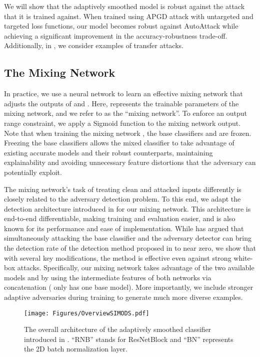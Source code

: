 \documentclass[11pt, letterpaper]{article}
\theoremstyle{plain}
\theoremstyle{definition}
\begin{document}
We will show that the adaptively smoothed model is robust against the attack that it is trained against. When trained using APGD attack with untargeted and targeted loss functions, our model becomes robust against AutoAttack while achieving a significant improvement in the accuracy-robustness trade-off. Additionally, in , we consider examples of transfer attacks.


\subsection{The Mixing Network} \label{sec:mixing_network}

In practice, we use a neural network  to learn an effective mixing network that adjusts the outputs of  and . Here,  represents the trainable parameters of the mixing network, and we refer to  as the ``mixing network''. To enforce an output range constraint, we apply a Sigmoid function to the mixing network output. Note that when training the mixing network , the base classifiers  and  are frozen. Freezing the base classifiers allows the mixed classifier to take advantage of existing accurate models and their robust counterparts, maintaining explainability and avoiding unnecessary feature distortions that the adversary can potentially exploit.

The mixing network's task of treating clean and attacked inputs differently is closely related to the adversary detection problem. To this end, we adapt the detection architecture introduced in \citep{Metzen17} for our mixing network. This architecture is end-to-end differentiable, making training and evaluation easier, and is also known for its performance and ease of implementation. While \citep{Carlini17b} has argued that simultaneously attacking the base classifier and the adversary detector can bring the detection rate of the detection method proposed in \citep{Metzen17} to near zero, we show that with several key modifications, the method is effective even against strong white-box attacks. Specifically, our mixing network  takes advantage of the two available models  and  by using the intermediate features of both networks via concatenation (\citep{Metzen17} only has one base model). More importantly, we include stronger adaptive adversaries during training to generate much more diverse examples.

\begin{figure*}
    \centering
    \texttt{[image: Figures/OverviewSIMODS.pdf]}
    \caption{The overall architecture of the adaptively smoothed classifier introduced in . ``RNB'' stands for ResNetBlock and ``BN'' represents the 2D batch normalization layer.}
    \label{fig:mixing_arch}
    \vspace{-1mm}
\end{figure*}
\end{document}
